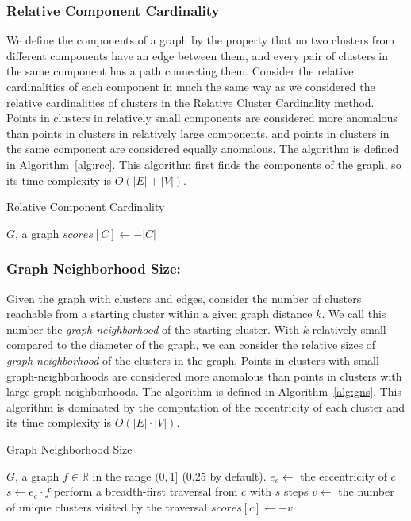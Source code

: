 \subsubsection{Relative Component Cardinality}
We define the components of a graph by the property that no two clusters from different components have an edge between them, and every pair of clusters in the same component has a path connecting them.
Consider the relative cardinalities of each component in much the same way as we considered the relative cardinalities of clusters in the Relative Cluster Cardinality method.
Points in clusters in relatively small components are considered more anomalous than points in clusters in relatively large components,
and points in clusters in the same component are considered equally anomalous.
The algorithm is defined in Algorithm~\ref{alg:rcc}.
This algorithm first finds the components of the graph, so its time complexity is $O(|E| + |V|)$.

\begin{algorithm}[h]
    \caption{Relative Component Cardinality}
    \label{alg:rcc}
\begin{algorithmic}[1]
    \REQUIRE $G$, a graph
        \STATE $scores[C] \gets -|C|$
    \ENDFOR
\end{algorithmic}
\end{algorithm}

\subsubsection{Graph Neighborhood Size:}
Given the graph with clusters and edges, consider the number of clusters reachable from a starting cluster within a given graph distance $k$.
We call this number the \textit{graph-neighborhood} of the starting cluster.
With $k$ relatively small compared to the diameter of the graph, we can consider the relative sizes of \textit{graph-neighborhood} of the clusters in the graph.
Points in clusters with small graph-neighborhoods are considered more anomalous than points in clusters with large graph-neighborhoods.
The algorithm is defined in Algorithm~\ref{alg:gns}.
This algorithm is dominated by the computation of the eccentricity of each cluster and its time complexity is $O(|E| \cdot |V|)$.

\begin{algorithm}[h]
    \caption{Graph Neighborhood Size}
    \label{alg:gns}
\begin{algorithmic}[1]
    \REQUIRE $G$, a graph
    \REQUIRE $f \in \mathbb{R}$ in the range $(0,1]$ ($0.25$ by default).
        \STATE $e_c \gets$ the eccentricity of $c$
        \STATE $s \gets e_c \cdot f$
        \STATE perform a breadth-first traversal from $c$ with $s$ steps
        \STATE $v \gets$ the number of unique clusters visited by the traversal
        \STATE $scores[c] \gets -v$
    \ENDFOR
\end{algorithmic}
\end{algorithm}

